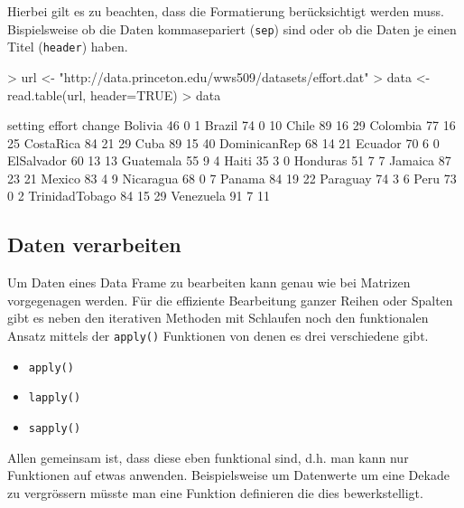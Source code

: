 Hierbei gilt es zu beachten, dass die Formatierung berücksichtigt
werden muss. Bispielsweise ob die Daten kommasepariert 
(\lstinline{sep}) sind oder ob die Daten je einen Titel 
(\lstinline{header}) haben.

\begin{Schunk}
\begin{Sinput}
> url <- "http://data.princeton.edu/wws509/datasets/effort.dat"
> data <- read.table(url, header=TRUE)
> data
\end{Sinput}
\begin{Soutput}
               setting effort change
Bolivia             46      0      1
Brazil              74      0     10
Chile               89     16     29
Colombia            77     16     25
CostaRica           84     21     29
Cuba                89     15     40
DominicanRep        68     14     21
Ecuador             70      6      0
ElSalvador          60     13     13
Guatemala           55      9      4
Haiti               35      3      0
Honduras            51      7      7
Jamaica             87     23     21
Mexico              83      4      9
Nicaragua           68      0      7
Panama              84     19     22
Paraguay            74      3      6
Peru                73      0      2
TrinidadTobago      84     15     29
Venezuela           91      7     11
\end{Soutput}
\end{Schunk}

\subsection{Daten verarbeiten}
Um Daten eines Data Frame zu bearbeiten kann genau wie bei Matrizen
vorgegenagen werden. Für die effiziente Bearbeitung ganzer Reihen
oder Spalten gibt es neben den iterativen Methoden mit Schlaufen noch
den funktionalen Ansatz mittels der \lstinline{apply()} Funktionen
von denen es drei verschiedene gibt.

\begin{itemize}
	\item \lstinline{apply()}
	\item \lstinline{lapply()}
	\item \lstinline{sapply()}
\end{itemize}

Allen gemeinsam ist, dass diese eben funktional sind, d.h. man
kann nur Funktionen auf etwas anwenden. Beispielsweise um Datenwerte
um eine Dekade zu vergrössern müsste man eine Funktion definieren
die dies bewerkstelligt.

